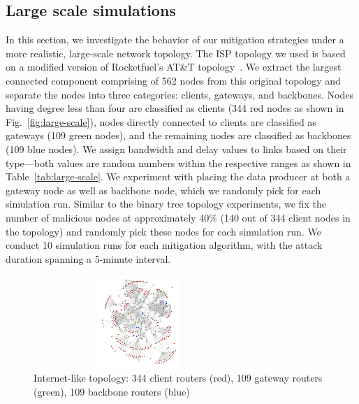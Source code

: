 \documentclass[10pt,conference]{IEEEtran}
\begin{document}
{%

\subsection{Large scale simulations}
\label{sec:largescale}


In this section, we investigate the behavior of our mitigation strategies under a more realistic, large-scale network topology. The ISP topology we used is based on a modified version of Rocketfuel's AT\&T topology~\cite{rocketfuel}.
We extract the largest connected component comprising of 562 nodes from this original topology and separate the nodes into three categories: clients, gateways, and backbones. Nodes having degree less than four are classified as clients (344 red nodes as shown in Fig.~\ref{fig:large-scale}), nodes directly connected to clients are classified as gateways (109 green nodes), and the remaining nodes are classified as backbones (109 blue nodes). 
We assign bandwidth and  delay values to links based on their type---both values are random numbers within the respective ranges as shown in Table~\ref{tab:large-scale}. We experiment with placing the data producer at both a gateway node as well as backbone node, which we randomly pick for each simulation run. Similar to the binary tree topology experiments, we fix the number of malicious nodes at approximately 40\% (140 out of 344 client nodes in the topology) and randomly pick these nodes for each simulation run. We conduct 10 simulation runs for each mitigation algorithm, with the attack duration spanning a 5-minute interval.

\begin{figure}[t]
  \centering
  \includegraphics[scale=0.15,angle=90,height=3.5cm,width=8cm]{7018-r0}
  \caption{Internet-like topology: 344 client routers (red), 109 gateway routers (green), 109 backbone routers (blue)}
  \label{fig:large-scale-topo}
\end{figure}

}
\end{document}
